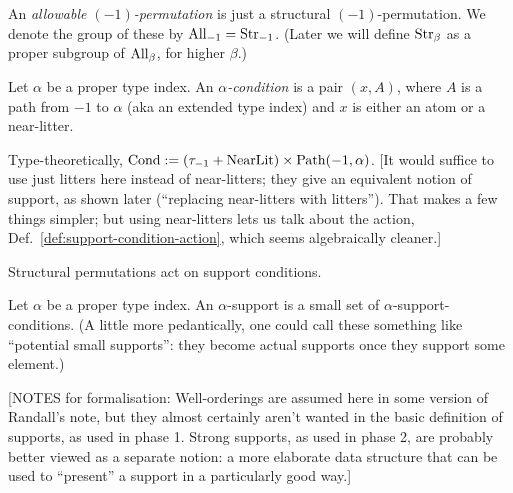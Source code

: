 \begin{definition}
  \label{def:allowable-perm-atoms}
  An \emph{allowable $(-1)$-permutation} is just a structural $(-1)$-permutation. We denote the group of these by $\mathrm{All}_{-1} = \mathrm{Str}_{-1}$.  (Later we will define $\mathrm{Str}_\beta$ as a proper subgroup of $\mathrm{All}_\beta$, for higher $\beta$.)
\end{definition}

\begin{definition}
  \label{def:support-condition}
  \leanok
  Let $\alpha$ be a proper type index. An \emph{$\alpha$-condition} is a pair $(x,A)$, where $A$ is a path from $-1$ to $\alpha$ (aka an extended type index) and $x$ is either an atom or a near-litter.

  Type-theoretically, $\mathrm{Cond} := (\tau_{-1} + \mathrm{NearLit}) \times \mathrm{Path}(-1,\alpha)$.
  [It would suffice to use just litters here instead of near-litters; they give an equivalent notion of support, as shown later (“replacing near-litters with litters”).  That makes a few things simpler; but using near-litters lets us talk about the action, Def.~\ref{def:support-condition-action}, which seems algebraically cleaner.]
\end{definition}

\begin{definition}
\label{def:support-condition-action}
\leanok
Structural permutations act on support conditions.
\end{definition}

\begin{definition}
\label{def:support}
\leanok
Let $\alpha$ be a proper type index. An $\alpha$-support is a small set of $\alpha$-support-conditions.  (A little more pedantically, one could call these something like “potential small supports”: they become actual supports once they support some element.)

[NOTES for formalisation: Well-orderings are assumed here in some version of Randall’s note, but they almost certainly aren’t wanted in the basic definition of supports, as used in phase 1. Strong supports, as used in phase 2, are probably better viewed as a separate notion: a more elaborate data structure that can be used to “present” a support in a particularly good way.]
\end{definition}

